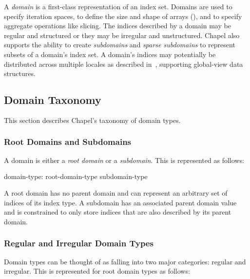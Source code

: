 \label{Domains}

A \emph{domain} is a first-class representation of an index set.
Domains are used to specify iteration spaces, to define the size and
shape of arrays (), and to specify aggregate operations
like slicing.  The indices described by a domain may be regular and
structured or they may be irregular and unstructured.  Chapel also
supports the ability to create \emph{subdomains} and \emph{sparse
subdomains} to represent subsets of a domain's index set.  A domain's
indices may potentially be distributed across multiple locales as
described in~, supporting global-view data
structures.


\subsection{Domain Taxonomy}
\label{Domain_Taxonomy}

This section describes Chapel's taxonomy of domain types.

\subsubsection{Root Domains and Subdomains}


A domain is either a \emph{root domain} or a \emph{subdomain}.  This
is represented as follows:

\begin{syntax}
domain-type:
  root-domain-type
  subdomain-type
\end{syntax}

 \noindent A root domain has no parent domain and can represent an
arbitrary set of indices of its index type.  A subdomain has an
associated parent domain value and is constrained to only store
indices that are also described by its parent domain.


\subsubsection{Regular and Irregular Domain Types}

Domain types can be thought of as falling into two major categories:
regular and irregular.  This is represented for root domain types as
follows:

